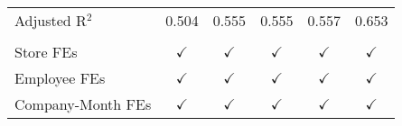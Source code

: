 \begin{tabular}{lccccc}
   Adjusted R$^2$          & 0.504         & 0.555         & 0.555         & 0.557          & 0.653\\  
    \\
   Store FEs               & $\checkmark$  & $\checkmark$  & $\checkmark$  & $\checkmark$   & $\checkmark$\\   
   Employee FEs            & $\checkmark$  & $\checkmark$  & $\checkmark$  & $\checkmark$   & $\checkmark$\\   
   Company-Month FEs       & $\checkmark$  & $\checkmark$  & $\checkmark$  & $\checkmark$   & $\checkmark$\\   
   \bottomrule
\end{tabular}
\par\endgroup


